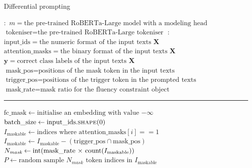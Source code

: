\begin{algorithm}
\caption{Differential prompting}\label{alg:diff}
\begin{algorithmic}[1]
\small
\Require $\boldsymbol{:}$ \newline $m = \text{the pre-trained RoBERTa-Large model with a modeling head}$
\newline $\text{tokeniser} = \text{the pre-trained RoBERTa-Large tokeniser}$
\Ensure $\boldsymbol{:}$ \newline $\text{input\_ids} = \text{the numeric format of the input texts }\mathbf{X}$ \newline
    $\text{attention\_masks} = \text{the binary format of the input texts }\mathbf{X} $ \newline
    $\mathbf{y} = \text{correct class labels of the input texts }\mathbf{X}$ \newline
    $\text{mask\_pos} = \text{positions of the mask token in the input texts}$ \newline
    $\text{trigger\_pos} = \text{positions of the trigger token in the prompted texts}$
    \newline
    $\text{mask\_rate} = \text{mask ratio for the fluency constraint object}$
\vspace{0.3em}
\hrule
\vspace{0.3em}
\State $\text{fc\_mask} \gets \text{initialise an embedding with value $-\infty$}$
{\color{mylightgrey}}
\State $\text{batch\_size} \gets \text{input\_ids}.\Call{shape}{0}$
{\color{mylightgrey}}  
        \State $I_\text{maskable} \gets \text{indices where attention\_masks}[i] == 1$
        {\color{mylightgrey}}
        \State $I_\text{maskable} \gets I_\text{maskable} - (\text{trigger\_pos} \cap \text{mask\_pos})$
        {\color{mylightgrey}}
        \State $N_\textit{mask} \gets \text{int(\text{mask\_rate} $\times$ \text{count}($I_\text{maskable}$))}$
        {\color{mylightgrey}}
        \State $P \gets \text{random sample $N_\textit{mask}$ token indices in $I_\text{maskable}$}$
        {\color{mylightgrey}}

\end{algorithmic}
\end{algorithm}
